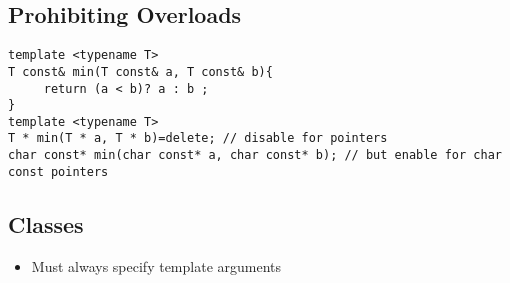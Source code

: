\subsection{Prohibiting Overloads}
\begin{lstlisting}
template <typename T>
T const& min(T const& a, T const& b){
	 return (a < b)? a : b ;
}
template <typename T>
T * min(T * a, T * b)=delete; // disable for pointers
char const* min(char const* a, char const* b); // but enable for char const pointers
\end{lstlisting}


\subsection{Classes}
\begin{itemize}
\item Must always specify template arguments
\end{itemize}

